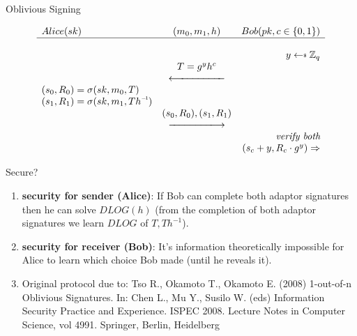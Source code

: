 \documentclass{beamer}
\newcommand\inv[1]{#1\raisebox{1.15ex}{$\scriptscriptstyle-\!1$}}
\newcommand\getsdollar{\mathrel{{\leftarrow}\vcenter{\hbox{\tiny\rmfamily\upshape\$}}}}
\begin{document}

\begin{frame}{Oblivious Signing}


\begin{figure}[!htb]
    \centering
    \[
    \begin{array}{l c r}
        Alice(sk) & (m_0,m_1, h) & Bob(pk, c \in \{0,1\}) \\
        \hline \\
        & & y \getsdollar{} \mathbb{Z}_q\\
        & T = g^{y}h^{c} & \\
        & \xlongleftarrow{\hspace{5em}}  & \\ 
        (s_0,R_0) = \sigma(sk, m_0, T) & & \\
        (s_1,R_1) = \sigma(sk, m_1, T\inv{h}) & & \\
        & (s_0,R_0), (s_1,R_1) & \\
        & \xlongrightarrow{\hspace{5em}} & \\
        & & \textit{verify both} \\
        & & (s_c + y,  R_c \cdot g^{y}) \Rightarrow \\
    \end{array}
    \]
\end{figure}
\end{frame}


\begin{frame}{Secure?}

\begin{enumerate}
    \item<1-> \textbf{security for sender (Alice)}: If Bob can complete both adaptor signatures then he can solve $DLOG(h)$ (from the completion of both adaptor signatures we learn $DLOG$ of $T, Th^{-1}$).
    \item<2-> \textbf{security for receiver (Bob)}: It's information theoretically impossible for Alice to learn which choice Bob made (until he reveals it).
    \item<3-> Original protocol due to:
Tso R., Okamoto T., Okamoto E. (2008) 1-out-of-n Oblivious Signatures. In: Chen L., Mu Y., Susilo W. (eds) Information Security Practice and Experience. ISPEC 2008. Lecture Notes in Computer Science, vol 4991. Springer, Berlin, Heidelberg
    
\end{enumerate}
    
\end{frame}
\end{document}
